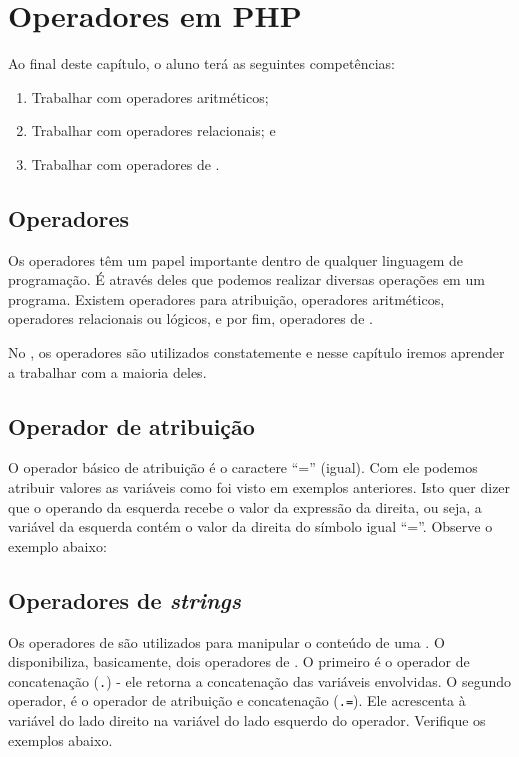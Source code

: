 \chapter{Operadores em PHP}

Ao final deste capítulo, o aluno terá as seguintes competências:
\begin{enumerate}
    \item Trabalhar com operadores aritméticos; 
    \item Trabalhar com operadores relacionais; e
    \item Trabalhar com operadores de \tipostring.
\end{enumerate}

\section{Operadores}
\label{operadores}

Os operadores têm um papel importante dentro de qualquer linguagem de programação.
É através deles que podemos realizar diversas operações em um programa. Existem
operadores para atribuição, operadores aritméticos, operadores relacionais ou lógicos,
e por fim, operadores de \tipostring.

No \php, os operadores são utilizados constatemente e nesse capítulo iremos
aprender a trabalhar com a maioria deles.

\section{Operador de atribuição}
\label{operador-atribuicao}

O operador básico de atribuição é o caractere ``='' (igual). Com ele podemos atribuir 
valores as variáveis como foi visto em exemplos anteriores. Isto quer dizer que o 
operando da esquerda recebe o valor da expressão da direita, ou seja, a variável da 
esquerda contém o valor da direita do símbolo igual ``=''. Observe o exemplo abaixo:



\section{Operadores de \textit{strings}}
\label{operadores-de-strings}
Os operadores de \tipostrings são utilizados para manipular o conteúdo de uma \tipostring.
O \php~ disponibiliza, basicamente, dois operadores de \tipostrings. O primeiro é o operador
de concatenação (\texttt{.}) - ele retorna a concatenação das variáveis envolvidas.
O segundo operador, é o operador de atribuição e concatenação (\texttt{.=}). Ele acrescenta
à variável do lado direito na variável do lado esquerdo do operador. Verifique os exemplos
abaixo.

